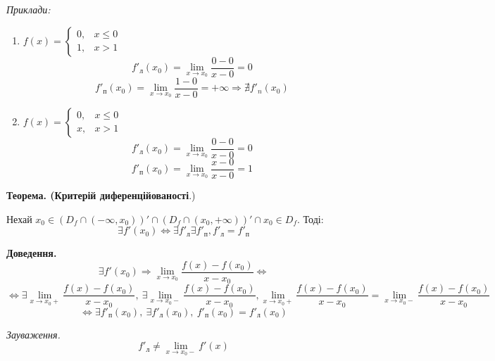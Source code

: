 \documentclass[12pt]{report}
\begin{document}
\textit{Приклади:}

\begin{enumerate}

\item $f(x) = \begin{cases} 0, & x \leq 0 \\ 1, & x > 1\end{cases}$
$$f'_{л}(x_0) = \lim_{x \to x_0} \frac{0 - 0}{x - 0} = 0$$
$$f'_{п}(x_0) = \lim_{x \to x_0} \frac{1 - 0}{x - 0} = +\infty \Longrightarrow \nexists f'_{n}(x_0)$$

\item $f(x) = \begin{cases} 0, & x \leq 0 \\ x, & x > 1\end{cases}$
$$f'_{л}(x_0) = \lim_{x \to x_0} \frac{0 - 0}{x - 0} = 0$$
$$f'_{п}(x_0) = \lim_{x \to x_0} \frac{x - 0}{x - 0} = 1$$
\end{enumerate}

\textbf{Теорема. (Критерій диференційованості}.) 

Нехай $x_0 \in (D_f \cap (-\infty, x_0))' \cap (D_f \cap (x_0, +\infty))' \cap x_0 \in D_f$. Тоді:
$$\exists f'(x_0) \Longleftrightarrow \exists f'_{л} \exists f'_{п}, f'_{л} = f'_{п}$$

\textbf{Доведення.} 
$$\exists f'(x_0) \Longrightarrow \lim_{x \to x_0}\frac{f(x) - f(x_0)}{x - x_0} \Longleftrightarrow$$
$$\Longleftrightarrow \exists \lim_{x\to x_0+}\frac{f(x) - f(x_0)}{x - x_0},\ \exists \lim_{x\to x_0-}\frac{f(x) - f(x_0)}{x - x_0}, \lim_{x\to x_0+}\frac{f(x) - f(x_0)}{x - x_0} = \lim_{x\to x_0-}\frac{f(x) - f(x_0)}{x - x_0}$$
$$\Longleftrightarrow \exists f'_{п}(x_0),\ \exists f'_{л}(x_0),\ f'_{п}(x_0) = f'_{л}(x_0)$$


\textit{Зауваження.}
$$f'_{л} \neq \lim_{x\to x_0-}f'(x)$$
\end{document}
